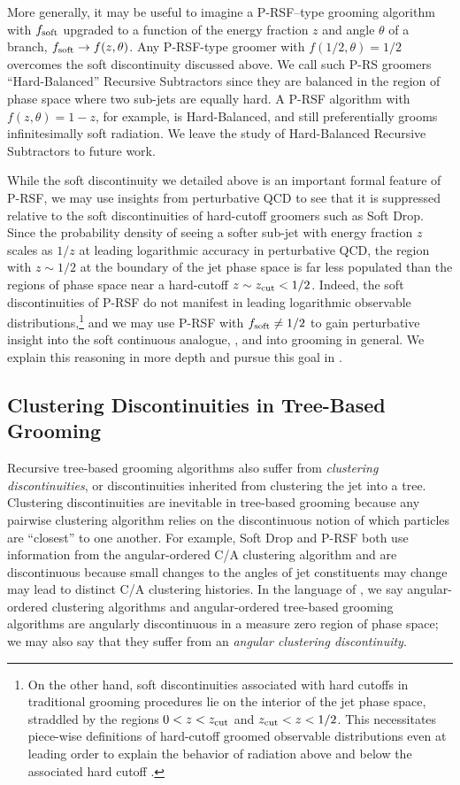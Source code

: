 More generally, it may be useful to imagine a P-RSF--type grooming algorithm with \(f_{\rm soft}\) upgraded to a function of the energy fraction \(z\) and angle \(\theta\) of a branch, \(f_{\rm soft} \to f(z,\theta)\).
%
Any P-RSF-type groomer with \(f(1/2, \theta) = 1/2\) overcomes the soft discontinuity discussed above.
%
We call such P-RS groomers ``Hard-Balanced'' Recursive Subtractors since they are balanced in the region of phase space where two sub-jets are equally hard.
%
A P-RSF algorithm with \(f(z, \theta) = 1 - z\), for example, is Hard-Balanced, and still preferentially grooms infinitesimally soft radiation.
%
We leave the study of Hard-Balanced Recursive Subtractors to future work.

While the soft discontinuity we detailed above is an important formal feature of P-RSF, we may use insights from perturbative QCD to see that it is suppressed relative to the soft discontinuities of hard-cutoff groomers such as Soft Drop.
%
Since the probability density of seeing a softer sub-jet with energy fraction \(z\) scales as \(1/z\) at leading logarithmic accuracy in perturbative QCD, the region with \(z \sim 1/2\) at the boundary of the jet phase space is far less populated than the regions of phase space near a hard-cutoff \(z \sim z_{\rm cut} < 1/2\).
%
Indeed, the soft discontinuities of P-RSF do not manifest in leading logarithmic observable distributions,\footnote{
On the other hand, soft discontinuities associated with hard cutoffs in traditional grooming procedures lie on the interior of the jet phase space, straddled by the regions \(0 < z < z_{\rm cut}\) and \(z_{\rm cut} < z < 1/2\).
%
This necessitates piece-wise definitions of hard-cutoff groomed observable distributions even at leading order to explain the behavior of radiation above and below the associated hard cutoff \cite{Larkoski:2014wba}.
} and we may use P-RSF with \(f_{\rm soft} \neq 1/2\) to gain perturbative insight into the soft continuous analogue, , and into \PIRANHA{} grooming in general.
%
We explain this reasoning in more depth and pursue this goal in .


\subsection{Clustering Discontinuities in Tree-Based Grooming}
\label{sec:ang_discont}

Recursive tree-based grooming algorithms also suffer from \textit{clustering discontinuities}, or discontinuities inherited from clustering the jet into a tree.
%
Clustering discontinuities are inevitable in tree-based grooming because any pairwise clustering algorithm relies on the discontinuous notion of which particles are ``closest'' to one another.
%
For example, Soft Drop and P-RSF both use information from the angular-ordered C/A clustering algorithm and are discontinuous because small changes to the angles of jet constituents may change may lead to distinct C/A clustering histories.
%
In the language of , we say angular-ordered clustering algorithms and angular-ordered tree-based grooming algorithms are angularly discontinuous in a measure zero region of phase space;
%
we may also say that they suffer from an \textit{angular clustering discontinuity}.

